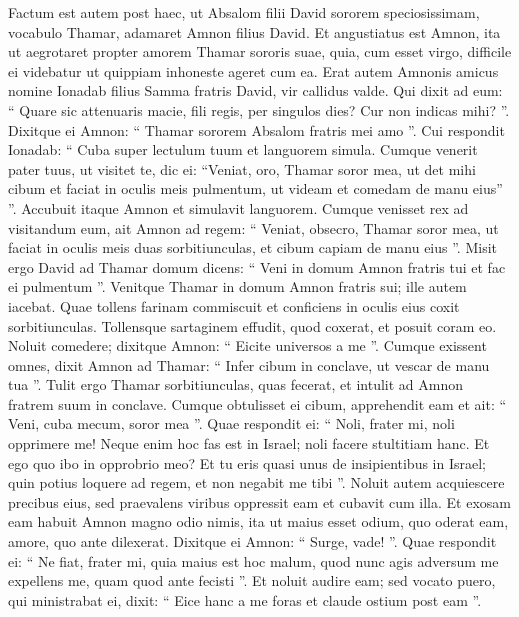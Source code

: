 \begin{biblechapter}
\begin{biblechapter}
\begin{biblechapter}
\begin{biblechapter}
\begin{biblechapter}
\begin{biblechapter}
\begin{biblechapter}
\begin{biblechapter}
\begin{biblechapter}
\begin{biblechapter}
\begin{biblechapter}
\begin{biblechapter}
\begin{biblechapter}
\verse Factum est autem post haec, ut Absalom filii David sororem speciosissimam, vocabulo Thamar, adamaret Amnon filius David. 
\verse Et angustiatus est Amnon, ita ut aegrotaret propter amorem Thamar sororis suae, quia, cum esset virgo, difficile ei videbatur ut quippiam inhoneste ageret cum ea. 
\verse Erat autem Amnonis amicus nomine Ionadab filius Samma fratris David, vir callidus valde. 
\verse Qui dixit ad eum: “ Quare sic attenuaris macie, fili regis, per singulos dies? Cur non indicas mihi? ”. Dixitque ei Amnon: “ Thamar sororem Absalom fratris mei amo ”. 
\verse Cui respondit Ionadab: “ Cuba super lectulum tuum et languorem simula. Cumque venerit pater tuus, ut visitet te, dic ei: “Veniat, oro, Thamar soror mea, ut det mihi cibum et faciat in oculis meis pulmentum, ut videam et comedam de manu eius” ”. 
\verse Accubuit itaque Amnon et simulavit languorem. Cumque venisset rex ad visitandum eum, ait Amnon ad regem: “ Veniat, obsecro, Thamar soror mea, ut faciat in oculis meis duas sorbitiunculas, et cibum capiam de manu eius ”.
 \verse Misit ergo David ad Thamar domum dicens: “ Veni in domum Amnon fratris tui et fac ei pulmentum ”. 
\verse Venitque Thamar in domum Amnon fratris sui; ille autem iacebat. Quae tollens farinam commiscuit et conficiens in oculis eius coxit sorbitiunculas. 
\verse Tollensque sartaginem effudit, quod coxerat, et posuit coram eo. Noluit comedere; dixitque Amnon: “ Eicite universos a me ”. Cumque exissent omnes, 
\verse dixit Amnon ad Thamar: “ Infer cibum in conclave, ut vescar de manu tua ”. Tulit ergo Thamar sorbitiunculas, quas fecerat, et intulit ad Amnon fratrem suum in conclave. 
\verse Cumque obtulisset ei cibum, apprehendit eam et ait: “ Veni, cuba mecum, soror mea ”. 
\verse Quae respondit ei: “ Noli, frater mi, noli opprimere me! Neque enim hoc fas est in Israel; noli facere stultitiam hanc. 
\verse Et ego quo ibo in opprobrio meo? Et tu eris quasi unus de insipientibus in Israel; quin potius loquere ad regem, et non negabit me tibi ”. 
\verse Noluit autem acquiescere precibus eius, sed praevalens viribus oppressit eam et cubavit cum illa.
 \verse Et exosam eam habuit Amnon magno odio nimis, ita ut maius esset odium, quo oderat eam, amore, quo ante dilexerat. Dixitque ei Amnon: “ Surge, vade! ”. 
\verse Quae respondit ei: “ Ne fiat, frater mi, quia maius est hoc malum, quod nunc agis adversum me expellens me, quam quod ante fecisti ”. Et noluit audire eam; 
\verse sed vocato puero, qui ministrabat ei, dixit: “ Eice hanc a me foras et claude ostium post eam ”. 

\end{biblechapter}
\end{biblechapter}
\end{biblechapter}
\end{biblechapter}
\end{biblechapter}
\end{biblechapter}
\end{biblechapter}
\end{biblechapter}
\end{biblechapter}
\end{biblechapter}
\end{biblechapter}
\end{biblechapter}
\end{biblechapter}
